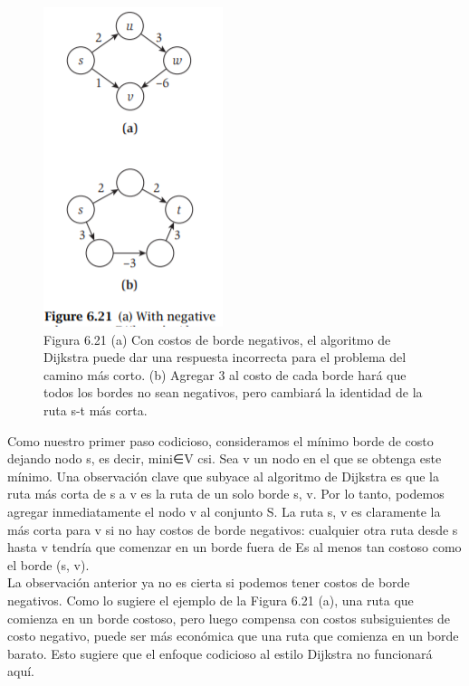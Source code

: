 \documentclass[a4paper]{article}
\begin{document}
\begin{figure}[h]
\centering
\includegraphics[scale=1]{Imagenes-Seccion6/fig6_21.PNG}
\caption{Figura 6.21 (a) Con costos de borde negativos, el algoritmo de Dijkstra puede dar una respuesta incorrecta para el problema del camino más corto. (b) Agregar 3 al costo de cada borde hará que todos los bordes no sean negativos, pero cambiará la identidad de la ruta s-t más corta.}
\end{figure}

Como nuestro primer paso codicioso, consideramos el mínimo borde de costo dejando nodo s, es decir, mini∈V csi. Sea v un nodo en el que se obtenga este mínimo. Una observación clave que subyace al algoritmo de Dijkstra es que la ruta más corta de s a v es la ruta de un solo borde {s, v}. Por lo tanto, podemos agregar inmediatamente el nodo v al conjunto S. La ruta {s, v} es claramente la más corta para v si no hay costos de borde negativos: cualquier otra ruta desde s hasta v tendría que comenzar en un borde fuera de Es al menos tan costoso como el borde (s, v).\\

La observación anterior ya no es cierta si podemos tener costos de borde negativos. Como lo sugiere el ejemplo de la Figura 6.21 (a), una ruta que comienza en un borde costoso, pero luego compensa con costos subsiguientes de costo negativo, puede ser más económica que una ruta que comienza en un borde barato. Esto sugiere que el enfoque codicioso al estilo Dijkstra no funcionará aquí.\\
\end{document}
